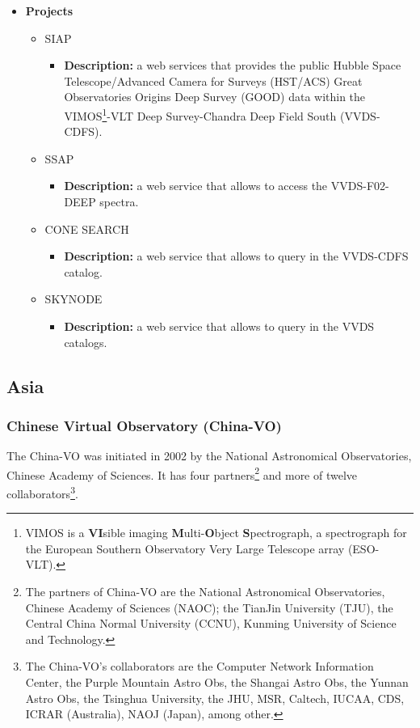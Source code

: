 \begin{itemize}
\item \textbf{Projects}
\begin{itemize}
\item SIAP
\begin{itemize}
\item \textbf{Description:} a web services that provides the public Hubble Space
Telescope/Advanced Camera for Surveys (HST/ACS) Great Observatories Origins Deep
Survey (GOOD) data within the VIMOS\footnote{VIMOS is a \textbf{VI}sible imaging
\textbf{M}ulti-\textbf{O}bject \textbf{S}pectrograph, a spectrograph for the
European Southern Observatory Very Large Telescope array (ESO-VLT).}-VLT Deep
Survey-Chandra Deep Field South (VVDS-CDFS).
\end{itemize}
\item SSAP
\begin{itemize}
\item \textbf{Description:} a web service that allows to access the
VVDS-F02-DEEP spectra.
\end{itemize}
\item CONE SEARCH
\begin{itemize}
\item \textbf{Description:} a web service that allows to query in the VVDS-CDFS
catalog. 
\end{itemize}
\item SKYNODE
\begin{itemize}
\item \textbf{Description:} a web service that allows to query in the VVDS
catalogs. 
\end{itemize}
\end{itemize}
\end{itemize}

\subsection{Asia}
\subsubsection{Chinese Virtual Observatory (China-VO)}
The China-VO was initiated in 2002 by the National Astronomical Observatories,
Chinese Academy of Sciences. It has four partners\footnote{The partners of
China-VO are the National Astronomical Observatories, Chinese Academy of
Sciences (NAOC); the TianJin University (TJU), the Central China Normal
University (CCNU), Kunming University of Science and Technology.} and more of
twelve collaborators\footnote{The China-VO's collaborators are the Computer
Network Information Center, the Purple Mountain Astro Obs, the Shangai Astro
Obs, the Yunnan Astro Obs, the Tsinghua University, the JHU, MSR, Caltech,
IUCAA, CDS, ICRAR (Australia), NAOJ (Japan), among other.}.

